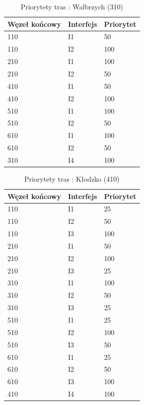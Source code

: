 \documentclass[a4paper]{article}
\begin{document}
\begin{table}[H]
	\centering
	\caption{Priorytety tras : Wałbrzych (310)}
	\label{xxx}
	\begin{tabular}{lll}
		\hline
		Węzeł końcowy & Interfejs & Priorytet \\        
        \hline
		110 & I1 & 50 \\
		110 & I2 & 100 \\
        \hline
		210 & I1 & 100 \\
		210 & I2 & 50 \\       
        \hline
		410 & I1 & 50 \\
		410 & I2 & 100 \\
        \hline
		510 & I1 & 100 \\
		510 & I2 & 50 \\
        \hline
		610 & I1 & 100 \\
		610 & I2 & 50 \\
        \hline
		310 & I4 & 100 \\
	\end{tabular}
\end{table}

\begin{table}[H]
	\centering
	\caption{Priorytety tras : Kłodzko (410)}
	\label{xxx}
	\begin{tabular}{lll}
		\hline
		Węzeł końcowy & Interfejs & Priorytet \\
        \hline
		110 & I1 & 25 \\
		110 & I2 & 50 \\
		110 & I3 & 100 \\
        \hline
		210 & I1 & 50 \\
		210 & I2 & 100 \\
		210 & I3 & 25 \\
        \hline
		310 & I1 & 100 \\
		310 & I2 & 50 \\
		310 & I3 & 25 \\
        \hline
		510 & I1 & 25 \\
		510 & I2 & 100 \\
		510 & I3 & 50 \\
        \hline
		610 & I1 & 25 \\
		610 & I2 & 50 \\
		610 & I3 & 100 \\
        \hline
		410 & I4 & 100 \\
	\end{tabular}
\end{table}
\end{document}

